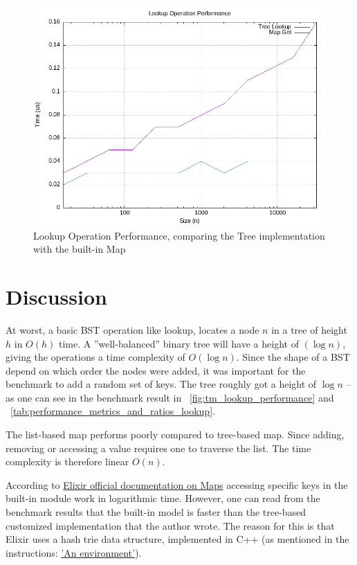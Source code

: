 \documentclass[a4paper,11pt]{article}
\begin{document}
\begin{figure}[htbp]
    \centering
    \includegraphics[width=\textwidth]{../data/tm_lookup_performance.png}
    \caption{Lookup Operation Performance, comparing the Tree implementation with the built-in Map}
    \label{fig:tm_lookup_performance}
\end{figure}

\section*{Discussion}
\label{sec:discussion}
At worst, a basic BST operation like lookup,
locates a node $n$ in a tree
of height $h$ in $O(h)$ time.
A ''well-balanced'' binary tree will have a height of $(\log n)$,
giving the operations a time complexity of $O(\log n)$.
Since the shape of a BST depend on which order the nodes were
added, it was important for the benchmark to add a random set of keys.
The tree roughly got a height of $\log n$ -- as one can see in the benchmark
result in ~\autoref{fig:tm_lookup_performance} and ~\autoref{tab:performance_metrics_and_ratios_lookup}.

The list-based map performs poorly compared to tree-based map.
Since adding, removing or accessing a value requires one to traverse the list.
The time complexity is therefore linear $O(n)$.

According to
\href{https://hexdocs.pm/elixir/1.12/Map.html}{Elixir official documentation on Maps}
accessing specific keys in the
built-in module work in logarithmic time.
    However, one can read from the benchmark results that the built-in model
    is faster than the tree-based customized implementation that the author wrote.
    The reason for this is that Elixir uses a hash trie data structure,
    implemented in C++ (as mentioned in the instructions:
\href{https://people.kth.se/~johanmon/courses/id1019/seminars/environment/environment.pdf}{'An environment'}).
\end{document}
